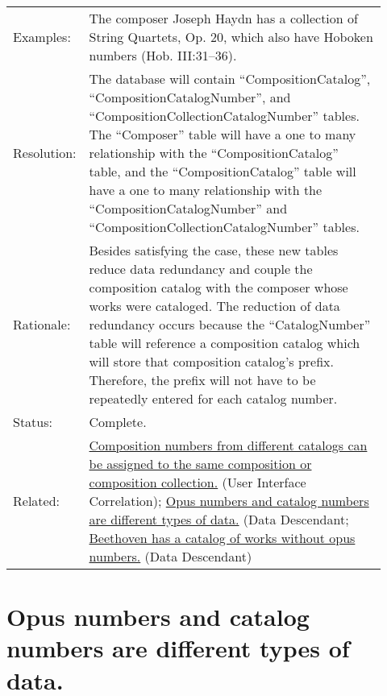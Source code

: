 \documentclass[letterpaper]{report}
\begin{document}
\begin{tabular}{ p{0.1\linewidth} p{0.825\linewidth} }
  Examples: & The composer Joseph Haydn has a collection of String Quartets, Op. 20, which also have Hoboken numbers (Hob. III:31--36). \\ 
  Resolution: & The database will contain ``CompositionCatalog'', ``CompositionCatalogNumber'', and ``CompositionCollectionCatalogNumber'' tables. The ``Composer'' table will have a one to many relationship with the ``CompositionCatalog'' table, and the  ``CompositionCatalog'' table will have a one to many relationship with the ``CompositionCatalogNumber'' and ``CompositionCollectionCatalogNumber'' tables. \\
  Rationale: & Besides satisfying the case, these new tables reduce data redundancy and couple the composition catalog with the composer whose works were cataloged. The reduction of data redundancy occurs because the ``CatalogNumber'' table will reference a composition catalog which will store that composition catalog's prefix. Therefore, the prefix will not have to be repeatedly entered for each catalog number. \\
  Status: & Complete. \\
  Related: & \hyperref[UI.2]{Composition numbers from different catalogs can be assigned to the same composition or composition collection.} (User Interface Correlation); \hyperref[D.3]{Opus numbers and catalog numbers are different types of data.} (Data Descendant; \hyperref[D.4]{Beethoven has a catalog of works without opus numbers.} (Data Descendant)
\end{tabular}

\section{Opus numbers and catalog numbers are different types of data.}
\label{D.3}
\end{document}
